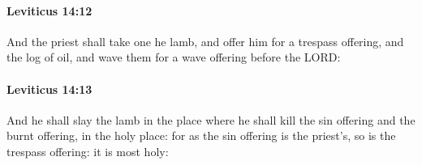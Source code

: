 		\paragraph{Leviticus 14:12} %
			\label{LEVITICUS-14-12}

			And the priest shall take one he lamb, and offer him for a trespass offering, and the log of oil, and wave them for a wave offering before the LORD:


		\paragraph{Leviticus 14:13} %
			\label{LEVITICUS-14-13}

			And he shall slay the lamb in the place where he shall kill the sin offering and the burnt offering, in the holy place: for as the sin offering is the priest’s, so is the trespass offering: it is most holy:

